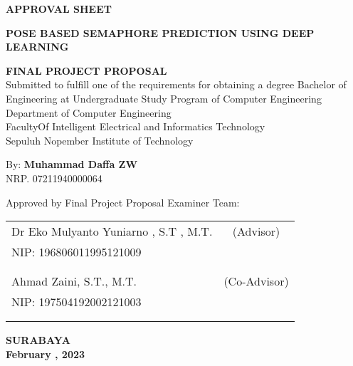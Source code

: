 \begin{center}
	\large
  \textbf{APPROVAL SHEET}
\end{center}

\thispagestyle{empty}

\begin{center}
  \textbf{POSE BASED SEMAPHORE PREDICTION USING DEEP LEARNING}
\end{center}

\begingroup
  \small

  \begin{center}
    \textbf{FINAL PROJECT PROPOSAL} \\
    Submitted to fulfill one of the requirements for obtaining a degree
    Bachelor of Engineering at 
    Undergraduate Study Program of Computer Engineering \\
    Department of Computer Engineering \\
    FacultyOf Intelligent Electrical and Informatics Technology  \\
    Sepuluh Nopember Institute of Technology
  \end{center}

  \begin{center}
    By: \textbf{Muhammad Daffa ZW} \\
    NRP. 07211940000064
  \end{center}

  \begin{center}
    Approved by Final Project Proposal Examiner Team:
  \end{center}

  \begingroup
    \setlength{\tabcolsep}{0pt}

    \noindent
    \begin{tabularx}{\textwidth}{X c}
      Dr Eko Mulyanto Yuniarno , S.T , M.T.       & (Advisor) \\
      NIP: 196806011995121009      & \\
      &  \\
      &  \\
      Ahmad Zaini, S.T., M.T.     & (Co-Advisor) \\
      NIP: 197504192002121003        & \\
      &  \\
      &  \\
    \end{tabularx}
  \endgroup

  \vspace{4ex}

  \begin{center}
    \textbf{SURABAYA} \\
    \textbf{February , 2023}
  \end{center}
\endgroup